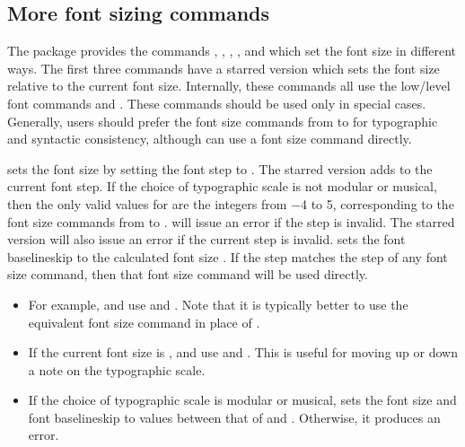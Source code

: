 \documentclass{beery}
\begin{document}
\subsection{More font sizing commands}
\label{subsec:fontsize}

The  package provides the commands , , , , and  which set the font size in different ways.
The first three commands have a starred version which sets the font size relative to the current font size.
Internally, these commands all use the low\-/level font commands  and .
These commands should be used only in special cases.
Generally, users should prefer the font size commands from  to  for typographic and syntactic consistency, although  can use a font size command directly.

\nopagebreak\newline
{}

 sets the font size by setting the font step to .
The starred version  adds  to the current font step.
If the choice of typographic scale is not modular or musical, then the only valid values for  are the integers from \num{-4} to \num{5}, corresponding to the font size commands from  to .
 will issue an error if the step is invalid.
The starred version  will also issue an error if the current step is invalid.
 sets the font baselineskip to the calculated font size \texttimes{} .
If the step matches the step of any font size command, then that font size command will be used directly.

\begin{itemize}
  \item
  For example,  and  use  and .
  Note that it is typically better to use the equivalent font size command in place of .
  \item
  If the current font size is ,  and  use  and .
  This is useful for moving up or down a note on the typographic scale.
  \item
  If the choice of typographic scale is modular or musical,  sets the font size and font baselineskip to values between that of  and .
  Otherwise, it produces an error.
\end{itemize}
\end{document}

